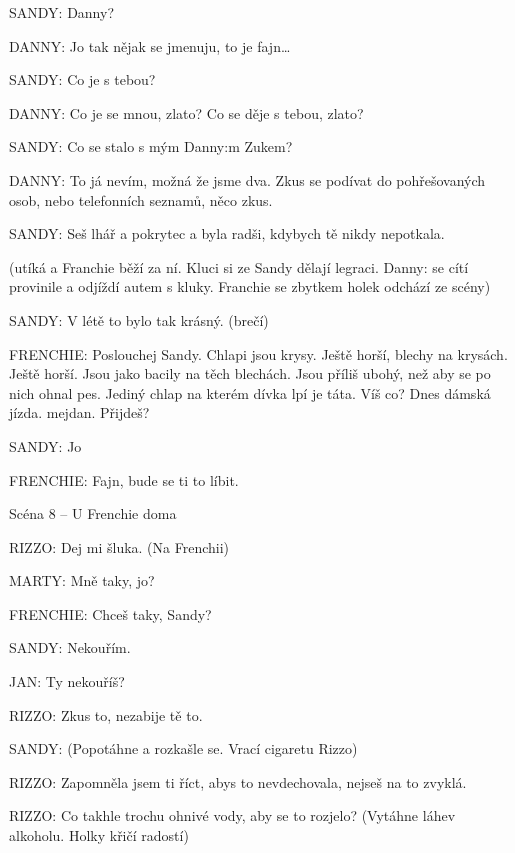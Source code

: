 \rep SANDY:        Danny?

\rep DANNY:        Jo tak nějak se jmenuju, to je fajn…

\rep SANDY:        Co je s tebou?

\rep DANNY:        Co je se mnou, zlato? Co se děje s tebou, zlato?

\rep SANDY:        Co se stalo s mým \rep Danny:m Zukem?

\rep DANNY:        To já nevím, možná že jsme dva. Zkus se podívat do pohřešovaných                 osob, nebo telefonních seznamů, něco zkus.

\rep SANDY:        Seš lhář a pokrytec a byla radši, kdybych tě nikdy nepotkala.

        (utíká a Franchie běží za ní. Kluci si ze Sandy dělají legraci. \rep Danny: se cítí         provinile a odjíždí autem s kluky. Franchie se zbytkem holek odchází ze scény) 

\rep SANDY:        V létě to bylo tak krásný. (brečí)

\rep FRENCHIE:         Poslouchej Sandy. Chlapi jsou krysy. Ještě horší, blechy na krysách.                 Ještě horší. Jsou jako bacily na těch blechách. Jsou příliš ubohý, než aby         se po nich ohnal pes. Jediný chlap na kterém dívka lpí je táta. Víš co?         Dnes dámská jízda. mejdan. Přijdeš?

\rep SANDY:        Jo

\rep FRENCHIE:         Fajn, bude se ti to líbit. 

Scéna 8 – U Frenchie doma 

\rep RIZZO:                Dej mi šluka. (Na Frenchii)

\rep MARTY:                Mně taky, jo? 

\rep FRENCHIE:                Chceš taky, Sandy?

\rep SANDY:                Nekouřím.

\rep JAN:                Ty nekouříš?

\rep RIZZO:                Zkus to, nezabije tě to.

\rep SANDY:                (Popotáhne a rozkašle se. Vrací cigaretu Rizzo)

\rep RIZZO:                Zapomněla jsem ti říct, abys to nevdechovala, nejseš na to zvyklá.

\rep RIZZO:                Co takhle trochu ohnivé vody, aby se to rozjelo? (Vytáhne                                 láhev alkoholu. Holky křičí radostí)

